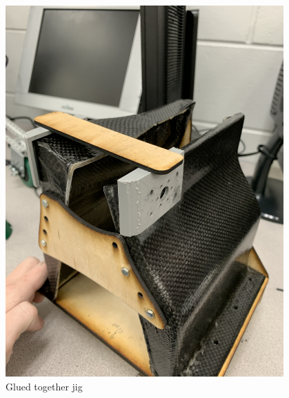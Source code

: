 \begin{figure}[htp]
\centering
\includegraphics[width=0.95\textwidth, angle=0]{Meetings/February/02-17-22/2-17-22_Hardware_Figure1 - Nathan Forrer.JPG}
\caption{Glued together jig}
\label{fig:021722_3}
\end{figure}

